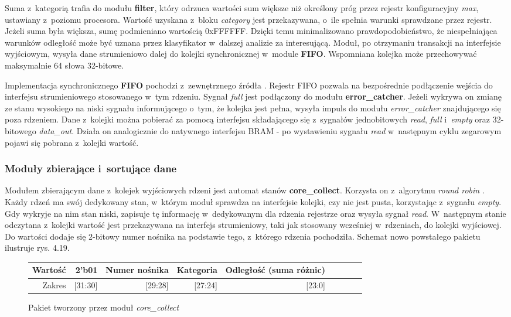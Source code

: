 Suma z~kategorią trafia do modułu \textbf{filter}, który odrzuca wartości sum większe niż określony próg przez rejestr konfiguracyjny \textit{max}, ustawiany z~poziomu procesora. Wartość uzyskana z~bloku \textit{category} jest przekazywana, o~ile spełnia warunki sprawdzane przez rejestr. Jeżeli suma była większa, sumę podmieniano wartością 0xFFFFFF. Dzięki temu minimalizowano prawdopodobieństwo, że niespełniająca warunków odległość może być uznana przez klasyfikator w~dalszej analizie za interesującą. Moduł, po otrzymaniu transakcji na interfejsie wyjściowym, wysyła dane strumieniowo dalej do kolejki synchronicznej w~module \textbf{FIFO}. Wspomniana kolejka może przechowywać maksymalnie 64 słowa 32-bitowe.

Implementacja synchronicznego \textbf{FIFO} pochodzi z~zewnętrznego źródła \cite{FIFO:source}. Rejestr FIFO pozwala na bezpośrednie podłączenie wejścia do interfejsu strumieniowego stosowanego w~tym rdzeniu. Sygnał \textit{full} jest podłączony do modułu \textbf{error\_catcher}. Jeżeli wykrywa on zmianę ze stanu wysokiego na niski sygnału informującego o~tym, że kolejka jest pełna, wysyła impuls do modułu \textit{error\_catcher} znajdującego się poza rdzeniem. Dane z~kolejki można pobierać za pomocą interfejsu składającego się z~sygnałów jednobitowych \textit{read}, \textit{full} i~\textit{empty} oraz 32-bitowego \textit{data\_out}. Działa on analogicznie do natywnego interfejsu BRAM - po wystawieniu sygnału \textit{read} w~następnym cyklu zegarowym pojawi się pobrana z~kolejki wartość.


\subsubsection{Moduły zbierające i~sortujące dane}
Modułem zbierającym dane z~kolejek wyjściowych rdzeni jest automat stanów \textbf{core\_collect}. Korzysta on z~algorytmu \textit{round robin} \cite{RoundRobin}. Każdy rdzeń ma swój dedykowany stan, w~którym moduł sprawdza na interfejsie kolejki, czy nie jest pusta, korzystając z~sygnału \textit{empty}. Gdy wykryje na nim stan niski, zapisuje tę informację w~dedykowanym dla rdzenia rejestrze oraz wysyła sygnał \textit{read}. W~następnym stanie odczytana z~kolejki wartość jest przekazywana na interfejs strumieniowy, taki jak stosowany wcześniej w~rdzeniach, do kolejki wyjściowej. Do wartości dodaje się 2-bitowy numer nośnika na podstawie tego, z~którego rdzenia pochodziła. Schemat nowo powstałego pakietu ilustruje rys. 4.19.

\begin{figure}[h]
	\centering
	\begin{tabular}{|r|r|r|r|r|r|r|r|r|}
		\hline
		Wartość & 2'b01 & Numer nośnika & Kategoria & Odległość (suma różnic) \\
		\hline
		Zakres & [31:30] & [29:28] & [27:24] & [23:0] \\
		\hline
	\end{tabular}
	\caption{Pakiet tworzony przez moduł \textit{core\_collect}}
\end{figure}
\FloatBarrier %

